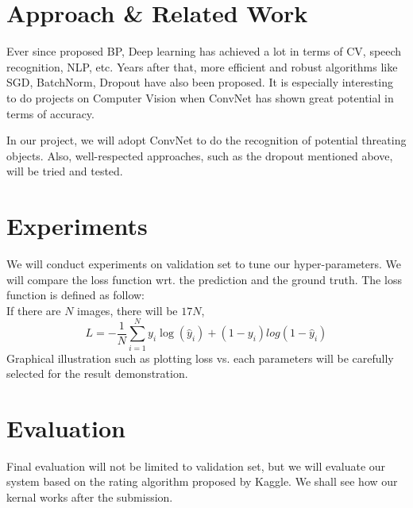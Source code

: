 \documentclass[conference,compsoc]{IEEEtran}
\begin{document}
\section{Approach \& Related Work}
	\par
	Ever since \cite{hinton2006fast} proposed BP, Deep learning has achieved a lot in terms of CV, speech recognition, NLP, etc.
	Years after that, more efficient and robust algorithms like SGD\cite{bottou2010large, lecun2012efficient}, BatchNorm\cite{ioffe2015batch}, Dropout\cite{hinton2012improving, srivastava2014dropout} have also been proposed. It is especially interesting to do projects on Computer Vision when ConvNet\cite{krizhevsky2012imagenet} has shown great potential in terms of accuracy.
	\par
	In our project, we will adopt ConvNet to do the recognition of potential threating objects. Also, well-respected approaches, such as the dropout mentioned above, will be tried and tested.
\section{Experiments}
	We will conduct experiments on validation set to tune our hyper-parameters. We will compare the loss function wrt. the prediction and the ground truth. The loss function is defined as follow: \\
	If there are $N$ images, there will be $17N$,
	$$ L = -\frac{1}{N}\sum_{i=1}^N{y_i\log(\hat{y}_i) + (1-y_i)log(1-\hat{y}_i)}$$
	Graphical illustration such as plotting loss vs. each parameters will be carefully selected for the result demonstration.
\section{Evaluation}
	Final evaluation will not be limited to validation set, but we will evaluate our system based on the rating algorithm proposed by Kaggle. We shall see how our kernal works after the submission.




\end{document}
